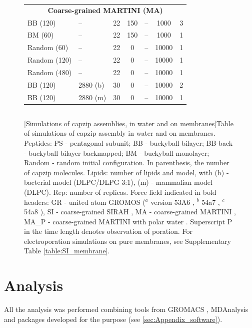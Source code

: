 \begin{figure}[p!]
\begin{tabular}{llccccc}
 \hline
\multicolumn{7}{c}{\textbf{Coarse-grained MARTINI (MA)}} \\
 BB (120) & -- & 22 & 150 & -- & 1000 & 3 \\
 BM (60) & -- & 22 & 150 & -- & 1000 & 1 \\
 Random (60) & -- & 22 & 0 & -- & 10000 & 1 \\
 Random (120) & -- & 22 & 0 & -- & 10000 & 1 \\
 Random (480) & -- & 22 & 0 & -- & 10000 & 1 \\
 BB (120) & 2880 (b) & 30 & 0 & -- & 10000 & 2 \\
 BB (120) & 2880 (m) & 30 & 0 & -- & 10000 & 1 \\
 \hline
 \end{tabular}
 \begin{tabular}{lcccccc}
 \hline
 \hline
\end{tabular}
\vspace{0.5cm}
[Simulations of capzip assemblies, in water and on membranes]{Table of simulations of capzip assembly in water and on membranes.
%
Peptides: PS - pentagonal subunit; BB - buckyball bilayer; BB-back - buckyball bilayer backmapped; BM - buckyball monolayer; Random - random initial configuration. In parenthesis, the number of capzip molecules.
%
Lipids: number of lipids and model, with (b) - bacterial model (DLPC/DLPG 3:1), (m) - mammalian model (DLPC).
%
Rep: number of replicas.
%
Force field indicated in bold headers: GR - united atom GROMOS ($^a$ version 53A6 \citep{Oostenbrink2004}, $^b$ 54a7 \citep{Schmid2011}, $^c$ 54a8 \citep{Reif2012}), SI - coarse-grained SIRAH \citep{Machado2018}, MA - coarse-grained MARTINI \citep{Marrink2007, Monticelli2008}, MA\_P - coarse-grained MARTINI with polar water \citep{Yesylevskyy2010}.
%
Superscript P in the time length denotes observation of poration.
%
For electroporation simulations on pure membranes, see Supplementary Table \ref{table:SI_membrane}.}
\label{table:sim_all}
\end{figure}

\section{Analysis} \label{sec:analysis}

All the analysis was performed combining tools from GROMACS \citep{Berendsen1995,Abraham2015,gromacs_man}, MDAnalysis \citep{Michaud-Agrawal2011,Gowers2016} and packages developed for the purpose (see \ref{sec:Appendix_software}).

